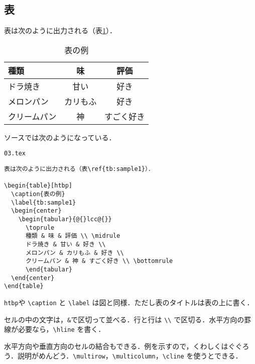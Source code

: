 \subsection{表}

表は次のように出力される（表\ref{tb:sample1}）．

\begin{table}[htbp]
  \caption{表の例}
  \label{tb:sample1}
  \begin{center}
    \begin{tabular}{@{}lcc@{}}
      \toprule
      種類 & 味 & 評価 \\ \midrule
      ドラ焼き & 甘い & 好き \\
      メロンパン & カリもふ & 好き \\
      クリームパン & 神 & すごく好き \\ \bottomrule
      \end{tabular}
  \end{center}
\end{table}

ソースでは次のようになっている．

\begin{itembox}[l]{\texttt{03.tex}}
\begin{verbatim}
表は次のように出力される（表\ref{tb:sample1}）．

\begin{table}[htbp]
  \caption{表の例}
  \label{tb:sample1}
  \begin{center}
    \begin{tabular}{@{}lcc@{}}
      \toprule
      種類 & 味 & 評価 \\ \midrule
      ドラ焼き & 甘い & 好き \\
      メロンパン & カリもふ & 好き \\
      クリームパン & 神 & すごく好き \\ \bottomrule
      \end{tabular}
  \end{center}
\end{table}
\end{verbatim}
\end{itembox}

\texttt{htbp}や \verb|\caption| と \verb|\label| は図と同様．ただし表のタイトルは表の上に書く．

セルの中の文字は，\texttt{\&}で区切って並べる．行と行は \verb|\\| で区切る．水平方向の罫線が必要なら，\verb|\hline| を書く．

水平方向や垂直方向のセルの結合もできる．例を示すので，くわしくはぐぐろう．説明がめんどう．\verb|\multirow|，\verb|\multicolumn|，\verb|\cline| を使うとできる．

